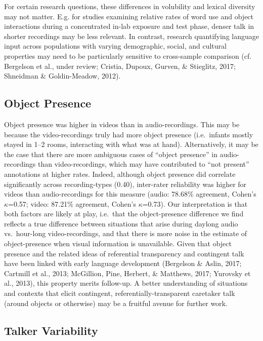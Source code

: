 \documentclass[man]{apa6}
\theoremstyle{definition}
\theoremstyle{definition}
\theoremstyle{definition}
\theoremstyle{remark}
\begin{document}
For certain research questions, these differences in volubility and
lexical diversity may not matter. E.g. for studies examining relative
rates of word use and object interactions during a concentrated in-lab
exposure and test phase, denser talk in shorter recordings may be less
relevant. In contrast, research quantifying language input across
populations with varying demographic, social, and cultural properties
may need to be particularly sensitive to cross-sample comparison (cf.
Bergelson et al., under review; Cristia, Dupoux, Gurven, \& Stieglitz,
2017; Shneidman \& Goldin-Meadow, 2012).

\subsection{Object Presence}\label{object-presence}

Object presence was higher in videos than in audio-recordings. This may
be because the video-recordings truly had more object presence
(i.e.~infants mostly stayed in 1--2 rooms, interacting with what was at
hand). Alternatively, it may be the case that there are more ambiguous
cases of \enquote{object presence} in audio-recordings than
video-recordings, which may have contributed to \enquote{not present}
annotations at higher rates. Indeed, although object presence did
correlate significantly across recording-types (0.40), inter-rater
reliability was higher for videos than audio-recordings for this measure
(audio: 78.68\% agreement, Cohen's \(\kappa\)=0.57; video: 87.21\%
agreement, Cohen's \(\kappa\)=0.73). Our interpretation is that both
factors are likely at play, i.e.~that the object-presence difference we
find reflects a true difference between situations that arise during
daylong audio vs.~hour-long video-recordings, and that there is more
noise in the estimate of object-presence when visual information is
unavailable. Given that object presence and the related ideas of
referential transparency and contingent talk have been linked with early
language development (Bergelson \& Aslin, 2017; Cartmill et al., 2013;
McGillion, Pine, Herbert, \& Matthews, 2017; Yurovsky et al., 2013),
this property merits follow-up. A better understanding of situations and
contexts that elicit contingent, referentially-transparent caretaker
talk (around objects or otherwise) may be a fruitful avenue for further
work.

\subsection{Talker Variability}\label{talker-variability}
\end{document}
